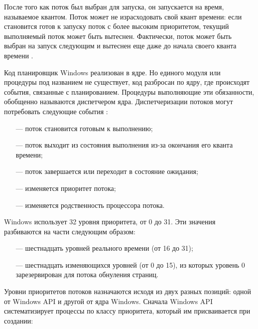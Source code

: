 После того как поток был выбран для запуска, он запускается на время, называемое квантом. Поток может не израсходовать свой квант времени: если становится готов к запуску поток с более высоким приоритетом, текущий выполняемый поток может быть вытеснен. Фактически, поток может быть выбран на запуск следующим и вытеснен еще даже до начала своего кванта времени \cite{win6}.

Код планировщик Windows реализован в ядре. Но единого модуля или процедуры под названием \guillemotright не существует, код разбросан по ядру, где происходят события, связанные с планированием. Процедуры выполняющие эти обязанности, обобщенно называются диспетчером ядра. Диспетчеризации потоков могут потребовать следующие события \cite{win6}:

\begin{itemize}
	\item[---] поток становится готовым к выполнению;
	\item[---]  поток выходит из состояния выполнения из-за окончания его кванта времени;
	\item[---]  поток завершается или переходит в состояние ожидания;
	\item[---]  изменяется приоритет потока;
	\item[---]  изменяется родственность процессора потока.
\end{itemize}

Windows использует 32 уровня приоритета, от 0 до 31. Эти значения  разбиваются на части следующим образом:
\begin{itemize}
		\item[---] шестнадцать уровней реального времени (от 16 до 31);
		\item[---] шестнадцать изменяющихся уровней (от 0 до 15), из которых уровень 0 зарезервирован для потока обнуления страниц. 
\end{itemize}


Уровни приоритетов потоков назначаются исходя из двух разных позиций: одной от Windows API и другой от ядра Windows. Сначала Windows API систематизирует процессы по классу приоритета, который им присваивается при создании:

